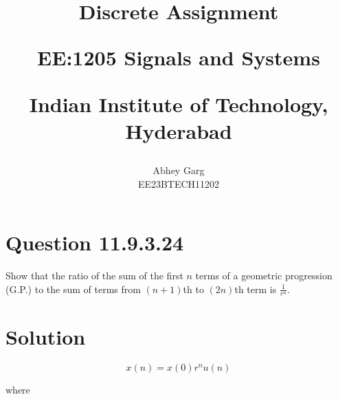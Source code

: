 \documentclass[journal,12pt,twocolumn]{IEEEtran}
\theoremstyle{remark}
\begin{document}
%




\vspace{3cm}

\title{
Discrete Assignment 

\large{EE:1205 Signals and Systems}

Indian Institute of Technology, Hyderabad
}
\author{Abhey Garg

EE23BTECH11202
}	


\maketitle

\newpage


\bigskip

\renewcommand{\thefigure}{\theenumi}
\renewcommand{\thetable}{\theenumi}

\section{Question 11.9.3.24}
Show that the ratio of the sum of the first \(n\) terms of a geometric progression (G.P.) to the sum of terms from \((n+1)\)th to \((2n)\)th term is \(\frac{1}{r^n}\).
\section{Solution}

\begin{equation}
x(n) = x(0) r^n u(n)
\end{equation}

where
\end{document}
